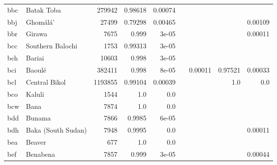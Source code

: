 \documentclass[11pt]{article}
\begin{document}
\begin{table*}[ht]
{\begin{tabular}{llrrrrrrr}
bbc         & Batak Toba         & 279942         & 0.98618         & 0.00074         &          &          &          &          \\

bbj         & Ghomálá'         & 27499         & 0.79298         & 0.00465         &          &          &          & 0.00109         \\

bbr         & Girawa         & 7675         & 0.999         & 3e-05         &          &          &          & 0.00011         \\

bcc         & Southern Balochi         & 1753         & 0.99313         & 3e-05         &          &          &          &          \\

bch         & Bariai         & 10603         & 0.998         & 3e-05         &          &          &          &          \\

bci         & Baoulé         & 382411         & 0.998         & 8e-05         &          & 0.00011         & 0.97521         & 0.00033         \\

bcl         & Central Bikol         & 1193855         & 0.99104         & 0.00039         &          &          & 1.0         & 0.0         \\

bco         & Kaluli         & 1544         & 1.0         & 0.0         &          &          &          &          \\

bcw         & Bana         & 7874         & 1.0         & 0.0         &          &          &          &          \\

bdd         & Bunama         & 7866         & 0.9985         & 6e-05         &          &          &          &          \\

bdh         & Baka (South Sudan)         & 7948         & 0.9995         & 0.0         &          &          &          & 0.00011         \\

bea         & Beaver         & 677         & 1.0         & 0.0         &          &          &          &          \\

bef         & Benabena         & 7857         & 0.999         & 3e-05         &          &          &          & 0.00044         \\


\end{tabular}}
\end{table*}
\end{document}
